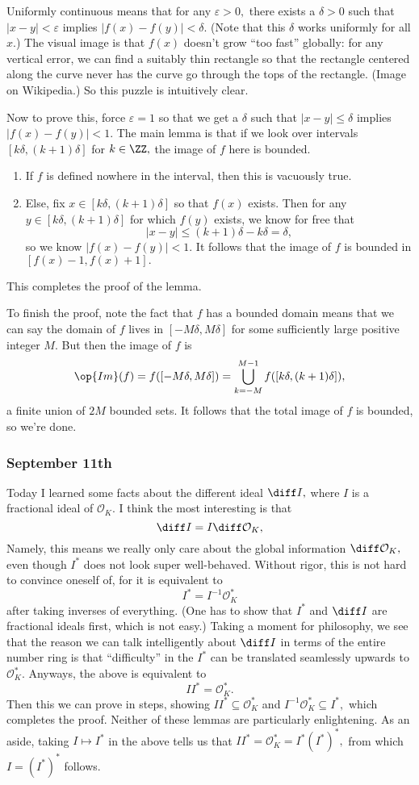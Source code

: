 Uniformly continuous means that for any $\varepsilon>0,$ there exists a $\delta>0$ such that $|x-y|<\varepsilon$ implies $|f(x)-f(y)|<\delta.$ (Note that this $\delta$ works uniformly for all $x.$) The visual image is that $f(x)$ doesn't grow ``too fast'' globally: for any vertical error, we can find a suitably thin rectangle so that the rectangle centered along the curve never has the curve go through the tops of the rectangle. (Image on Wikipedia.) So this puzzle is intuitively clear.

Now to prove this, force $\varepsilon=1$ so that we get a $\delta$ such that $|x-y|\le\delta$ implies $|f(x)-f(y)|<1.$ The main lemma is that if we look over intervals $[k\delta,(k+1)\delta]$ for $k\in\ZZ,$ the image of $f$ here is bounded.
\begin{enumerate}[label=(\alph*)]
    \item If $f$ is defined nowhere in the interval, then this is vacuously true.
    \item Else, fix $x\in[k\delta,(k+1)\delta]$ so that $f(x)$ exists. Then for any $y\in[k\delta,(k+1)\delta]$ for which $f(y)$ exists, we know for free that
    \[|x-y|\le(k+1)\delta-k\delta=\delta,\]
    so we know $|f(x)-f(y)|<1.$ It follows that the image of $f$ is bounded in $[f(x)-1,f(x)+1].$
\end{enumerate}
This completes the proof of the lemma.

To finish the proof, note the fact that $f$ has a bounded domain means that we can say the domain of $f$ lives in $[-M\delta, M\delta]$ for some sufficiently large positive integer $M.$ But then the image of $f$ is
\[\op{Im}(f)=f([-M\delta,M\delta])=\bigcup_{k=-M}^{M-1}f([k\delta,(k+1)\delta]),\]
a finite union of $2M$ bounded sets. It follows that the total image of $f$ is bounded, so we're done.

\subsubsection{September 11th}
Today I learned some facts about the different ideal $\diff I,$ where $I$ is a fractional ideal of $\mathcal O_K.$ I think the most interesting is that
\[\diff I=I\diff\mathcal O_K,\]
Namely, this means we really only care about the global information $\diff\mathcal O_K,$ even though $I^*$ does not look super well-behaved. Without rigor, this is not hard to convince oneself of, for it is equivalent to
\[I^*=I^{-1}\mathcal O_K^*\]
after taking inverses of everything. (One has to show that $I^*$ and $\diff I$ are fractional ideals first, which is not easy.) Taking a moment for philosophy, we see that the reason we can talk intelligently about $\diff I$ in terms of the entire number ring is that ``difficulty'' in the $I^*$ can be translated seamlessly upwards to $\mathcal O_K^*.$ Anyways, the above is equivalent to
\[II^*=\mathcal O_K^*.\]
Then this we can prove in steps, showing $II^*\subseteq\mathcal O_K^*$ and $I^{-1}\mathcal O_K^*\subseteq I^*,$ which completes the proof. Neither of these lemmas are particularly enlightening. As an aside, taking $I\mapsto I^*$ in the above tells us that $II^*=\mathcal O_K^*=I^*(I^*)^*,$ from which $I=(I^*)^*$ follows.

